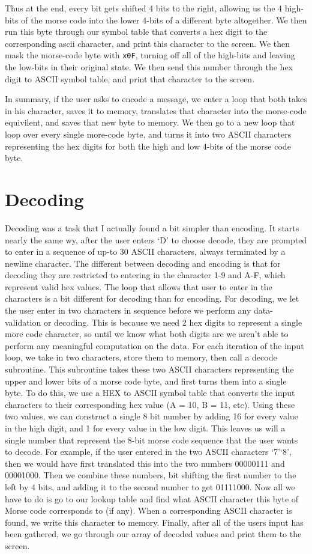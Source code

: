 \documentclass[a4paper,11pt]{article}
\begin{document}
 Thus at the end, every bit gets shifted 4 bits to the right, allowing us the 4 high-bits of the morse code into the lower 4-bits of a different byte altogether. We then run this byte through our symbol table that converts a hex digit to the corresponding ascii character, and print this character to the screen. We then mask the morse-code byte with \texttt{x0F}, turning off all of the high-bits and leaving the low-bits in their original state. We then send this number through the hex digit to ASCII symbol table, and print that character to the screen. \par
 In summary, if the user asks to encode a message, we enter a loop that both takes in his character, saves it to memory, translates that character into the morse-code equivilent, and saves that new byte to memory. We then go to a new loop that loop over every single more-code byte, and turns it into two ASCII characters representing the hex digits for both the high and low 4-bits of the morse code byte.

 \section{Decoding}
 Decoding was a task that I actually found a bit simpler than encoding. It starts nearly the same wy, after the user enters `D' to choose decode, they are prompted to enter in a sequence of up-to 30 ASCII characters, always terminated by a newline character. The different between decoding and encoding is that for decoding they are restricted to entering in the character 1-9 and A-F, which represent valid hex values. The loop that allows that user to enter in the characters is a bit different for decoding than for encoding. For decoding, we let the user enter in two characters in sequence before we perform any data-validation or decoding. This is because we need 2 hex digits to represent a single more code character, so until we know what both digits are we aren't able to perform any meaningful computation on the data. For each iteration of the input loop, we take in two characters, store them to memory, then call a decode subroutine. This subroutine takes these two ASCII characters representing the upper and lower bits of a morse code byte, and first turns them into a single byte. To do this, we use a HEX to ASCII symbol table that converts the input characters to their corresponding hex value (A = 10, B = 11, etc). Using these two values, we can construct a single 8 bit number by adding 16 for every value in the high digit, and 1 for every value in the low digit. This leaves us will a single number that represent the 8-bit morse code sequence that the user wants to decode. For example, if the user entered in the two ASCII characters `7'`8', then we would have first translated this into the two numbers 00000111 and 00001000. Then we combine these numbers, bit shifting the first number to the left by 4 bits, and adding it to the second number to get 01111000. Now all we have to do is go to our lookup table and find what ASCII character this byte of Morse code corresponds to (if any). When a corresponding ASCII character is found, we write this character to memory. Finally, after all of the users input has been gathered, we go through our array of decoded values and print them to the screen.
\end{document}

